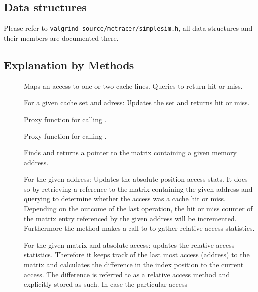 \subsection{Data structures}
Please refer to \texttt{valgrind-source/mctracer/simplesim.h}, all data structures and their members are documented there.

\subsection{Explanation by Methods}

\begin{description} %
\item[] Maps an access to one or two cache lines. Queries  to return hit or miss.
\item[] For a given cache set and adress: Updates the set and returns hit or miss.
\item[] Proxy function for calling .
\item[] Proxy function for calling .
\item[] Finds and returns a pointer to the matrix containing a given memory address.
\item[] For the given address: Updates the absolute position
    access stats. It does so by retrieving a reference to the matrix containing the given address and
    querying  to determine whether the access was a cache hit or miss. Depending on the outcome
    of the last operation, the hit or miss counter of the matrix entry referenced by the given address will be incremented.
    Furthermore the method makes a call to  to gather relative access statistics.
\item[] For
    the given matrix and absolute access: updates the relative access statistics. Therefore it keeps track of the last most
    access (address) to the matrix and calculates the difference in the index position to the current access. The
    difference is referred to as a relative access method and explicitly stored as such. In case the particular access

\end{description}
